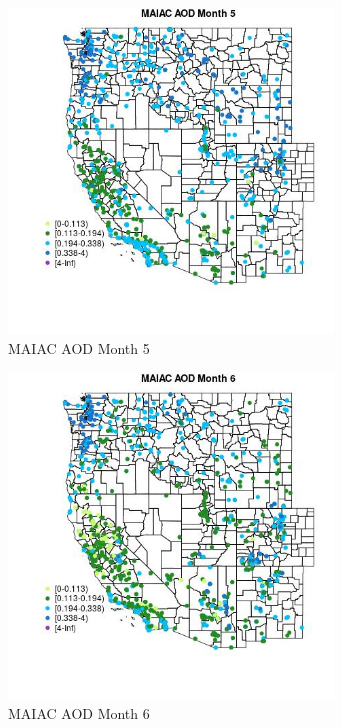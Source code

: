 \begin{figure} 
\centering  
\includegraphics[width=0.77\textwidth]{Code_Outputs/Report_ML_input_PM25_Step4_part_f_de_duplicated_aves_prioritize_24hr_obswNAs_MapObsMo5MAIAC_AOD.jpg} 
\caption{\label{fig:Report_ML_input_PM25_Step4_part_f_de_duplicated_aves_prioritize_24hr_obswNAsMapObsMo5MAIAC_AOD}MAIAC AOD Month 5} 
\end{figure} 
 

\begin{figure} 
\centering  
\includegraphics[width=0.77\textwidth]{Code_Outputs/Report_ML_input_PM25_Step4_part_f_de_duplicated_aves_prioritize_24hr_obswNAs_MapObsMo6MAIAC_AOD.jpg} 
\caption{\label{fig:Report_ML_input_PM25_Step4_part_f_de_duplicated_aves_prioritize_24hr_obswNAsMapObsMo6MAIAC_AOD}MAIAC AOD Month 6} 
\end{figure} 
 

